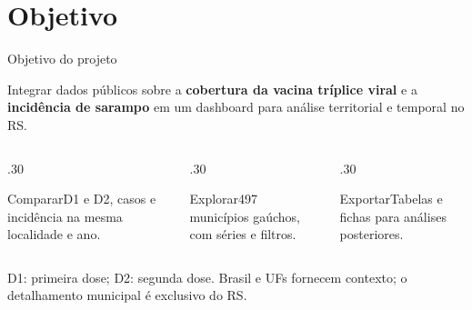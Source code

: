 \documentclass[aspectratio=169]{beamer}
\newcommand{\fonte}[1]{\vfill{\tiny\color{InfGray}#1\par}}
\begin{document}
\section{Objetivo}
\begin{frame}[t]{Objetivo do projeto}
\vspace{4mm}
{\large Integrar dados públicos sobre a \textbf{cobertura da vacina tríplice viral} e a \textbf{incidência de sarampo} em um dashboard para análise territorial e temporal no RS.\par}
\vspace{5mm}
\begin{columns}[T,onlytextwidth]
\begin{column}{.30\textwidth}\begin{block}{Comparar}D1 e D2, casos e incidência na mesma localidade e ano.\end{block}\end{column}
\begin{column}{.30\textwidth}\begin{block}{Explorar}497 municípios gaúchos, com séries e filtros.\end{block}\end{column}
\begin{column}{.30\textwidth}\begin{block}{Exportar}Tabelas e fichas para análises posteriores.\end{block}\end{column}
\end{columns}
\fonte{D1: primeira dose; D2: segunda dose. Brasil e UFs fornecem contexto; o detalhamento municipal é exclusivo do RS.}
\end{frame}
\end{document}
